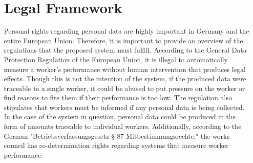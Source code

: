\section{Legal Framework}
Personal rights regarding personal data are highly important in Germany and the entire European Union. Therefore, it is important to provide an overview of the regulations that the proposed system must fulfill.
According to the General Data Protection Regulation \cite{REGULATIONEU2016} of the European Union, it is illegal to automatically measure a worker's performance without human intervention that produces legal effects. Though this is not the intention of the system, if the produced data were traceable to a single worker, it could be abused to put pressure on the worker or find reasons to fire them if their performance is too low. The regulation also stipulates that workers must be informed if any personal data is being collected. In the case of the system in question, personal data could be produced in the form of amounts traceable to individual workers.
Additionally, according to the German "Betriebsverfassungsgesetz § 87 Mitbestimmungsrechte," \cite{87BetrVGEinzelnorm} the works council has co-determination rights regarding systems that measure worker performance.


